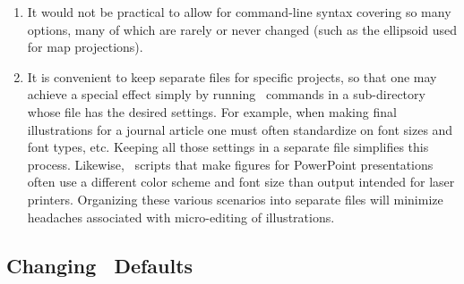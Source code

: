 \begin{enumerate}

\item It would not be practical to allow for command-line syntax
covering so many options, many of which are rarely or never
changed (such as the ellipsoid used for map projections).

\item It is convenient to keep separate 
files for specific projects, so that one may achieve a special
effect simply by running \GMT\ commands in a sub-directory whose
 file has the desired settings.  For example,
when making final illustrations for a journal article one must often
standardize on font sizes and font types, etc.  Keeping all those
settings in a separate  file simplifies this
process.  Likewise, \GMT\ scripts that make figures for PowerPoint
presentations often use a different color scheme and font size than
output intended for laser printers.  Organizing these various scenarios
into separate  files will minimize headaches
associated with micro-editing of illustrations.


\end{enumerate}

\subsection{Changing \gmt\ Defaults}

